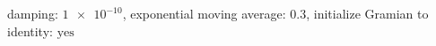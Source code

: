 damping: $\num[scientific-notation=true]{1e-10}$, exponential moving average: $\num[scientific-notation=true]{0.3}$, initialize Gramian to identity: $\text{yes}$